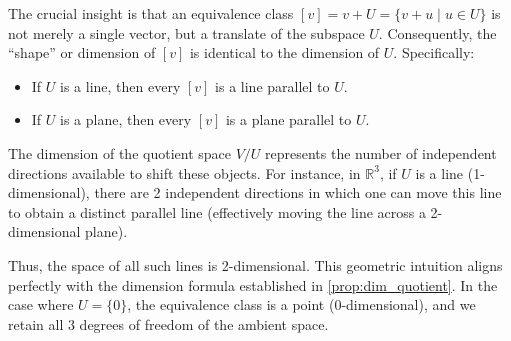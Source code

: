 \begin{remark}
  The crucial insight is that an equivalence class $[v] = v + U = \{v + u \mid u \in U\}$ is not merely a single vector, but a translate of the subspace $U$. Consequently, the ``shape'' or dimension of $[v]$ is identical to the dimension of $U$. Specifically:
  \begin{itemize}
    \item If $U$ is a line, then every $[v]$ is a line parallel to $U$.
    \item If $U$ is a plane, then every $[v]$ is a plane parallel to $U$.
  \end{itemize}
  The dimension of the quotient space $V/U$ represents the number of independent directions available to shift these objects. For instance, in $\mathbb{R}^3$, if $U$ is a line (1-dimensional), there are 2 independent directions in which one can move this line to obtain a distinct parallel line (effectively moving the line across a 2-dimensional plane). 
  
  Thus, the space of all such lines is 2-dimensional. This geometric intuition aligns perfectly with the dimension formula established in \cref{prop:dim_quotient}. In the case where $U = \{0\}$, the equivalence class is a point (0-dimensional), and we retain all 3 degrees of freedom of the ambient space.
\end{remark}

